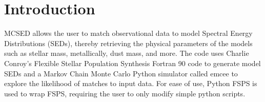 \documentclass{article}
\begin{document}





\section{Introduction}
MCSED allows the user to match observational data to model Spectral Energy Distributions (SEDs), thereby retrieving the physical parameters of the models such as stellar mass, metallically, dust mass, and more.  The code uses Charlie Conroy's Flexible Stellar Population Synthesis Fortran 90 code to generate model SEDs and a Markov Chain Monte Carlo Python simulator called emcee to explore the likelihood of matches to input data.  For ease of use, Python FSPS is used to wrap FSPS, requiring the user to only modify simple python scripts. 
\end{document}
